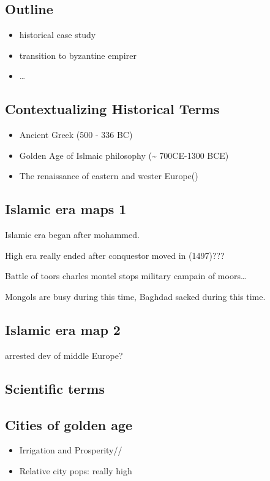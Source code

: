 \documentclass[11pt]{article}
\begin{document}
\subsection{Outline}
\label{sec-8-2}
\begin{itemize}
\item historical case study
\item transition to byzantine empirer
\item \ldots{}
\end{itemize}

\subsection{Contextualizing Historical Terms}
\label{sec-8-3}
\begin{itemize}
\item Ancient Greek (500 - 336 BC)\\
\item Golden Age of Islmaic philosophy (\textasciitilde{} 700CE-1300 BCE)\\
\item The renaissance of eastern and wester Europe()\\
\end{itemize}

\subsection{Islamic era maps 1}
\label{sec-8-4}
Islamic era began after mohammed.

High era really ended after conquestor moved in (1497)???

Battle of toors charles montel stops military campain of moors\ldots{}

Mongols are busy during this time, Baghdad sacked during this time.

\subsection{Islamic era map 2}
\label{sec-8-5}
arrested dev of middle Europe?

\subsection{Scientific terms}
\label{sec-8-6}

\subsection{Cities of golden age}
\label{sec-8-7}
\begin{itemize}
\item Irrigation and Prosperity//
\item Relative city pops: really high
\end{itemize}
\end{document}
